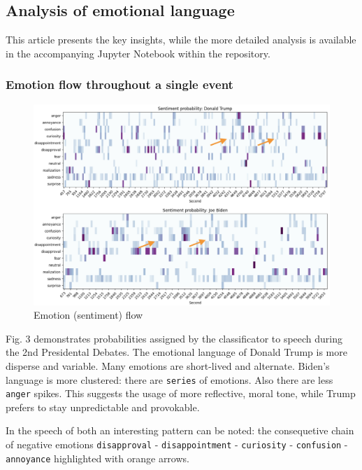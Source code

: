 \documentclass[pdflatex,sn-mathphys-num]{sn-jnl}%
\begin{document}
\subsection{Analysis of emotional language}
This article presents the key insights, while the more detailed analysis is available in the accompanying Jupyter Notebook within the repository.

\subsubsection{Emotion flow throughout a single event}

\begin{figure}[h]
	\centering
	\includegraphics[width=13cm]{f3-emotion_flow.png}
	\caption{Emotion (sentiment)  flow}
\end{figure}

Fig. 3 demonstrates probabilities assigned by the classificator to speech during the 2nd Presidental Debates.
The emotional language of Donald Trump is more disperse and variable. Many emotions are short-lived and alternate.
Biden's language is more clustered: there are \texttt{series} of emotions. Also there are less \texttt{anger} spikes. This suggests the usage of more reflective, moral tone, while Trump prefers to stay unpredictable and provokable.

In the speech of both an interesting pattern can be noted: the consequetive chain of negative emotions \texttt{disapproval} - \texttt{disappointment} - \texttt{curiosity} - \texttt{confusion} - \texttt{annoyance} highlighted with orange arrows.
\end{document}

